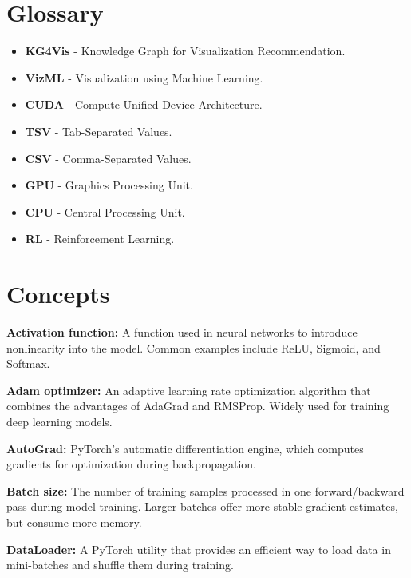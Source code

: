 \section{Glossary}

\begin{itemize}
    \item \textbf{KG4Vis} - Knowledge Graph for Visualization Recommendation.
    \item \textbf{VizML} - Visualization using Machine Learning.
    \item \textbf{CUDA} - Compute Unified Device Architecture.
    \item \textbf{TSV} - Tab-Separated Values.
    \item \textbf{CSV} - Comma-Separated Values.
    \item \textbf{GPU} - Graphics Processing Unit.
    \item \textbf{CPU} - Central Processing Unit.
    \item \textbf{RL} - Reinforcement Learning.
\end{itemize}
\vspace{18.0cm}

\section{Concepts}

\vspace{0.3cm}
\noindent\textbf{Activation function:} A function used in neural networks to introduce nonlinearity into the model. Common examples include ReLU, Sigmoid, and Softmax.

\vspace{0.3cm}
\noindent\textbf{Adam optimizer:} An adaptive learning rate optimization algorithm that combines the advantages of AdaGrad and RMSProp. Widely used for training deep learning models.

\vspace{0.3cm}
\noindent\textbf{AutoGrad:} PyTorch’s automatic differentiation engine, which computes gradients for optimization during backpropagation.

\vspace{0.3cm}
\noindent\textbf{Batch size:} The number of training samples processed in one forward/backward pass during model training. Larger batches offer more stable gradient estimates, but consume more memory.

\vspace{0.3cm}
\noindent\textbf{DataLoader:} A PyTorch utility that provides an efficient way to load data in mini-batches and shuffle them during training.

